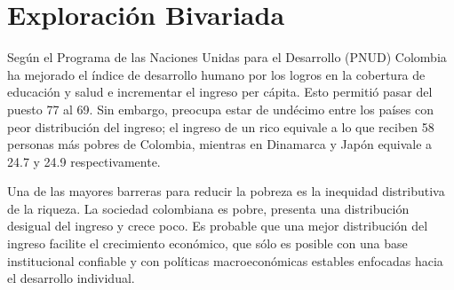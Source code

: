 \section{Exploración Bivariada}\label{bivariada}


Según el Programa de las Naciones Unidas para el Desarrollo (PNUD) Colombia ha mejorado el índice de desarrollo humano por los logros en la cobertura de educación y salud e incrementar el ingreso per cápita. Esto permitió pasar del puesto 77 al 69. Sin embargo, preocupa estar de undécimo entre los países con peor distribución del ingreso; el ingreso de un rico equivale a lo que reciben 58 personas más pobres de Colombia, mientras en Dinamarca y Japón equivale a 24.7 y 24.9 respectivamente.

Una de las mayores barreras para reducir la pobreza es la inequidad distributiva de la riqueza. La sociedad colombiana es pobre, presenta una distribución desigual del ingreso y crece poco. Es probable que una mejor distribución del ingreso facilite el crecimiento económico, que sólo es posible con una base institucional confiable y con políticas macroeconómicas estables enfocadas hacia el desarrollo individual.

